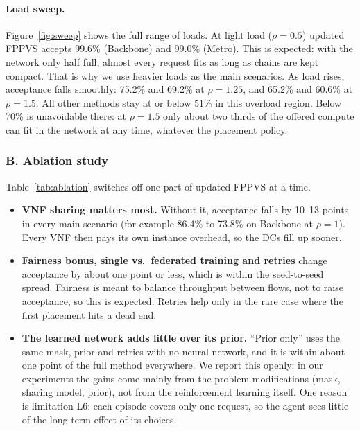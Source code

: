\paragraph{Load sweep.} Figure~\ref{fig:sweep} shows the full range of loads. At
light load ($\rho=0.5$) updated FPPVS accepts 99.6\% (Backbone) and 99.0\%
(Metro). This is expected: with the network only half full, almost every request
fits as long as chains are kept compact. That is why we use heavier loads as the
main scenarios. As load rises, acceptance falls smoothly: 75.2\% and 69.2\% at
$\rho=1.25$, and 65.2\% and 60.6\% at $\rho=1.5$. All other methods stay at or
below 51\% in this overload region. Below 70\% is unavoidable there: at
$\rho=1.5$ only about two thirds of the offered compute can fit in the network at
any time, whatever the placement policy.

\subsubsection*{B. Ablation study}

\begin{table}[H]
\centering\small
\caption{Ablation: hold-out acceptance (\%) of updated FPPVS with one part
switched off at a time.}
\label{tab:ablation}

\end{table}

Table~\ref{tab:ablation} switches off one part of updated FPPVS at a time.
\begin{itemize}
  \item \textbf{VNF sharing matters most.} Without it, acceptance falls by 10--13
  points in every main scenario (for example 86.4\% to 73.8\% on Backbone at
  $\rho=1$). Every VNF then pays its own instance overhead, so the DCs fill up
  sooner.
  \item \textbf{Fairness bonus, single vs.\ federated training and retries}
  change acceptance by about one point or less, which is within the
  seed-to-seed spread. Fairness is meant to balance throughput between flows, not
  to raise acceptance, so this is expected. Retries help only in the rare case
  where the first placement hits a dead end.
  \item \textbf{The learned network adds little over its prior.} ``Prior only''
  uses the same mask, prior and retries with no neural network, and it is within
  about one point of the full method everywhere. We report this openly: in our
  experiments the gains come mainly from the problem modifications (mask, sharing
  model, prior), not from the reinforcement learning itself. One reason is
  limitation L6: each episode covers only one request, so the agent sees little
  of the long-term effect of its choices.
\end{itemize}

